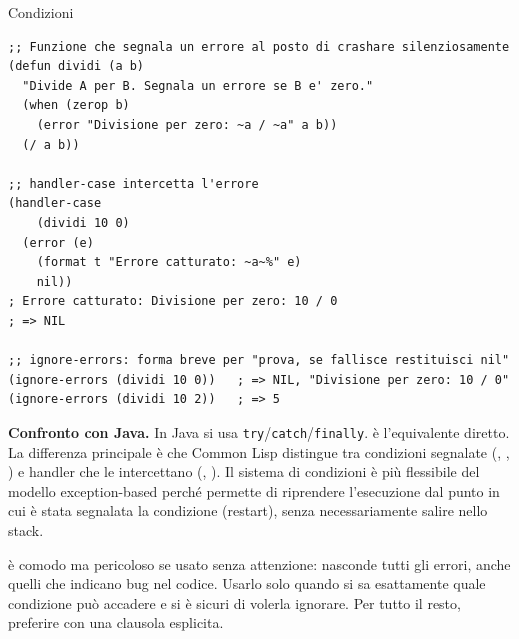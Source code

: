 \begin{concetto}{Condizioni}
\end{concetto}

\begin{esempio}
\begin{lstlisting}
;; Funzione che segnala un errore al posto di crashare silenziosamente
(defun dividi (a b)
  "Divide A per B. Segnala un errore se B e' zero."
  (when (zerop b)
    (error "Divisione per zero: ~a / ~a" a b))
  (/ a b))

;; handler-case intercetta l'errore
(handler-case
    (dividi 10 0)
  (error (e)
    (format t "Errore catturato: ~a~%" e)
    nil))
; Errore catturato: Divisione per zero: 10 / 0
; => NIL

;; ignore-errors: forma breve per "prova, se fallisce restituisci nil"
(ignore-errors (dividi 10 0))   ; => NIL, "Divisione per zero: 10 / 0"
(ignore-errors (dividi 10 2))   ; => 5
\end{lstlisting}
\end{esempio}

\begin{confronto}
\textbf{Confronto con Java.}
In Java si usa \texttt{try}/\texttt{catch}/\texttt{finally}.
 è l'equivalente diretto.
La differenza principale è che Common Lisp distingue
tra condizioni segnalate (, , )
e handler che le intercettano (,
).
Il sistema di condizioni è più flessibile del modello
exception-based perché permette di riprendere l'esecuzione
dal punto in cui è stata segnalata la condizione
(restart), senza necessariamente salire nello stack.
\end{confronto}

\begin{attenzione}
 è comodo ma pericoloso se usato
senza attenzione: nasconde tutti gli errori, anche
quelli che indicano bug nel codice.
Usarlo solo quando si sa esattamente quale condizione
può accadere e si è sicuri di volerla ignorare.
Per tutto il resto, preferire  con
una clausola esplicita.
\end{attenzione}

